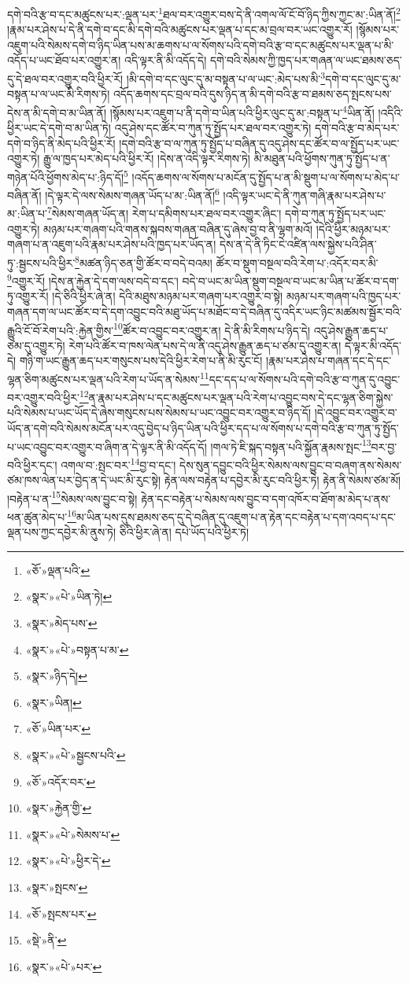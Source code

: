 དགེ་བའི་རྩ་བ་དང་མཚུངས་པར་:ལྡན་པར་\footnote{«ཅོ་»ལྡན་པའི་}ཐལ་བར་འགྱུར་བས་དེ་ནི་འགལ་ལོ་ངོ་བོ་ཉིད་ཀྱིས་ཀྱང་མ་:ཡིན་ནོ།\footnote{«སྣར་»«པེ་»ཡིན་ཏེ།} །རྣམ་པར་ཤེས་པ་དེ་ནི་དགེ་བ་དང་མི་དགེ་བའི་མཚུངས་པར་ལྡན་པ་དང་མ་བྲལ་བར་ཡང་འགྱུར་རོ། །སྙོམས་པར་འཇུག་པའི་སེམས་དགེ་བ་ཉིད་ཡིན་པས་མ་ཆགས་པ་ལ་སོགས་པའི་དགེ་བའི་རྩ་བ་དང་མཚུངས་པར་ལྡན་པ་མི་འདོད་པ་ཡང་ཐོབ་པར་འགྱུར་ན། འདི་ལྟར་ནི་མི་འདོད་དེ། དགེ་བའི་སེམས་ཀྱི་ཁྱད་པར་གཞན་ལ་ཡང་ཐམས་ཅད་དུ་དེ་ཐལ་བར་འགྱུར་བའི་ཕྱིར་རོ། །མི་དགེ་བ་དང་ལུང་དུ་མ་བསྟན་པ་ལ་ཡང་:མེད་པས་མི་\footnote{«སྣར་»མེད་པས་}དགེ་བ་དང་ལུང་དུ་མ་བསྟན་པ་ལ་ཡང་མི་རིགས་ཏེ། འདོད་ཆགས་དང་བྲལ་བའི་དུས་ཉིད་ན་མི་དགེ་བའི་རྩ་བ་ཐམས་ཅད་སྤངས་པས་དེས་ན་མི་དགེ་བ་མ་ཡིན་ནོ། །སྙོམས་པར་འཇུག་པ་ནི་དགེ་བ་ཡིན་པའི་ཕྱིར་ལུང་དུ་མ་:བསྟན་པ་\footnote{«སྣར་»«པེ་»བསྟན་པ་མ་}ཡིན་ནོ། །འདིའི་ཕྱིར་ཡང་དེ་དགེ་བ་མ་ཡིན་ཏེ། འདུ་ཤེས་དང་ཚོར་བ་ཀུན་ཏུ་སྤྱོད་པར་ཐལ་བར་འགྱུར་ཏེ། དགེ་བའི་རྩ་བ་མེད་པར་དགེ་བ་ཉིད་ནི་མེད་པའི་ཕྱིར་རོ། །དགེ་བའི་རྩ་བ་ལ་ཀུན་ཏུ་སྤྱོད་པ་བཞིན་དུ་འདུ་ཤེས་དང་ཚོར་བ་ལ་སྤྱོད་པར་ཡང་འགྱུར་ཏེ། རྒྱུ་ལ་ཁྱད་པར་མེད་པའི་ཕྱིར་རོ། །དེས་ན་འདི་ལྟར་རིགས་ཏེ། མི་མཐུན་པའི་ཕྱོགས་ཀུན་ཏུ་སྤྱོད་པ་ན་གཉེན་པོའི་ཕྱོགས་མེད་པ་:ཉིད་དོ།\footnote{«སྣར་»ཉིད་དེ།} །འདོད་ཆགས་ལ་སོགས་པ་མངོན་དུ་སྤྱོད་པ་ན་མི་སྡུག་པ་ལ་སོགས་པ་མེད་པ་བཞིན་ནོ། །དེ་ལྟར་དེ་ལས་སེམས་གཞན་ཡོད་པ་མ་:ཡིན་ནོ།\footnote{«སྣར་»ཡིན།} །འདི་ལྟར་ཡང་དེ་ནི་ཀུན་གཞི་རྣམ་པར་ཤེས་པ་མ་:ཡིན་པ་\footnote{«ཅོ་»ཡིན་པར་}སེམས་གཞན་ཡོད་ན། རེག་པ་དམིགས་པར་ཐལ་བར་འགྱུར་ཞིང་། དགེ་བ་ཀུན་ཏུ་སྤྱོད་པར་ཡང་འགྱུར་ཏེ། མཉམ་པར་གཞག་པའི་གནས་སྐབས་གཞན་བཞིན་དུ་ཞེས་བྱ་བ་ནི་ལྷག་མའོ། །དེའི་ཕྱིར་མཉམ་པར་གཞག་པ་ན་འཇུག་པའི་རྣམ་པར་ཤེས་པའི་ཁྱད་པར་ཡོད་ན། དེས་ན་དེ་ནི་ཏིང་ངེ་འཛིན་ལས་སྐྱེས་པའི་ཤིན་ཏུ་:སྦྱངས་པའི་ཕྱིར་\footnote{«སྣར་»«པེ་»སྦྱངས་པའི་}མཚན་ཉིད་ཅན་གྱི་ཚོར་བ་བདེ་བའམ། ཚོར་བ་སྡུག་བསྔལ་བའི་རེག་པ་:འདོར་བར་མི་\footnote{«ཅོ་»འདོར་བར་}འགྱུར་རོ། །དེས་ན་རྐྱེན་དེ་དག་ལས་བདེ་བ་དང་། བདེ་བ་ཡང་མ་ཡིན་སྡུག་བསྔལ་བ་ཡང་མ་ཡིན་པ་ཚོར་བ་དག་ཏུ་འགྱུར་རོ། །དེ་ཅིའི་ཕྱིར་ཞེ་ན། དེའི་མཐུས་མཉམ་པར་གཞག་པར་འགྱུར་བ་སྟེ། མཉམ་པར་གཞག་པའི་ཁྱད་པར་གཞན་དག་ལ་ཡང་ཚོར་བ་དེ་དག་འབྱུང་བའི་མཐུ་ཡོད་པ་མཐོང་བ་དེ་བཞིན་དུ་འདིར་ཡང་ཉིང་མཚམས་སྦྱོར་བའི་རྒྱུའི་ངོ་བོ་རེག་པའི་:རྐྱེན་གྱིས་\footnote{«སྣར་»རྐྱེན་གྱི་}ཚོར་བ་འབྱུང་བར་འགྱུར་ན། དེ་ནི་མི་རིགས་པ་ཉིད་དེ། འདུ་ཤེས་རྒྱུན་ཆད་པ་ཙམ་དུ་འགྱུར་ཏེ། རེག་པའི་ཚོར་བ་ཁས་ལེན་པས་དེ་ལ་ནི་འདུ་ཤེས་རྒྱུན་ཆད་པ་ཙམ་དུ་འགྱུར་ན། དེ་ལྟར་མི་འདོད་དེ། གཉི་ག་ཡང་རྒྱུན་ཆད་པར་གསུངས་པས་དེའི་ཕྱིར་རེག་པ་ནི་མི་རུང་ངོ། །རྣམ་པར་ཤེས་པ་གཞན་དང་དེ་དང་ལྷན་ཅིག་མཚུངས་པར་ལྡན་པའི་རེག་པ་ཡོད་ན་སེམས་\footnote{«སྣར་»«པེ་»སེམས་པ་}དང་དད་པ་ལ་སོགས་པའི་དགེ་བའི་རྩ་བ་ཀུན་དུ་འབྱུང་བར་འགྱུར་བའི་ཕྱིར་\footnote{«སྣར་»«པེ་»ཕྱིར་དེ་}ན་རྣམ་པར་ཤེས་པ་དང་མཚུངས་པར་ལྡན་པའི་རེག་པ་འབྱུང་བས་དེ་དང་ལྷན་ཅིག་སྐྱེས་པའི་སེམས་པ་ཡང་ཡོད་དེ་ཞེས་གསུངས་པས་སེམས་པ་ཡང་འབྱུང་བར་འགྱུར་བ་ཉིད་དོ། །དེ་འབྱུང་བར་འགྱུར་བ་ཡོད་ན་དགེ་བའི་སེམས་མངོན་པར་འདུ་བྱེད་པ་ཉིད་ཡིན་པའི་ཕྱིར་དད་པ་ལ་སོགས་པ་དགེ་བའི་རྩ་བ་ཀུན་ཏུ་སྤྱོད་པ་ཡང་འབྱུང་བར་འགྱུར་བ་ཞིག་ན་དེ་ལྟར་ནི་མི་འདོད་དོ། །གལ་ཏེ་ཇི་སྐད་བསྟན་པའི་སྐྱོན་རྣམས་སྤང་\footnote{«སྣར་»སྤངས་}བར་བྱ་བའི་ཕྱིར་དང་། འགལ་བ་:སྤང་བར་\footnote{«ཅོ་»སྤངས་པར་}བྱ་བ་དང་། དེས་སུན་དབྱུང་བའི་ཕྱིར་སེམས་ལས་བྱུང་བ་བཞག་ནས་སེམས་ཙམ་ཁས་ལེན་པར་བྱེད་ན་དེ་ཡང་མི་རུང་སྟེ། རྟེན་ལས་བརྟེན་པ་དབྱེར་མི་རུང་བའི་ཕྱིར་ཏེ། རྟེན་ནི་སེམས་ཙམ་མོ། །བརྟེན་པ་ན་\footnote{«སྡེ་»ནི་}སེམས་ལས་བྱུང་བ་སྟེ། རྟེན་དང་བརྟེན་པ་སེམས་ལས་བྱུང་བ་དག་འཁོར་བ་ཐོག་མ་མེད་པ་ནས་ཕན་ཚུན་མེད་པ་\footnote{«སྣར་»«པེ་»པར་}མ་ཡིན་པས་དུས་ཐམས་ཅད་དུ་དེ་བཞིན་དུ་འཇུག་པ་ན་རྟེན་དང་བརྟེན་པ་དག་འབད་པ་དང་ལྡན་པས་ཀྱང་དབྱེར་མི་ནུས་ཏེ། ཅིའི་ཕྱིར་ཞེ་ན། དཔེ་ཡོད་པའི་ཕྱིར་ཏེ། 